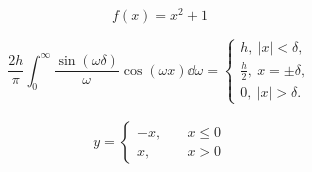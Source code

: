 \begin{equation}
f(x) = x^2 + 1
\end{equation}

\begin{equation}
\frac{2h}{\pi}\int_{0}^{\infty}\frac{\sin\left( \omega\delta \right)}{\omega}
		\cos\left( \omega x \right) \dd\omega = 
        \begin{cases}
                h, \ \left| x \right| < \delta,\\ 
                \frac{h}{2}, \ x = \pm \delta,\\ 
                0, \ \left| x \right| > \delta.
        \end{cases}
\end{equation}

\begin{equation}
        \begin{aligned}
        y= \begin{cases}
                -x,\quad &x\leq 0 \\
                x,\quad &x>0
            \end{cases} 
        \end{aligned}
\end{equation}


